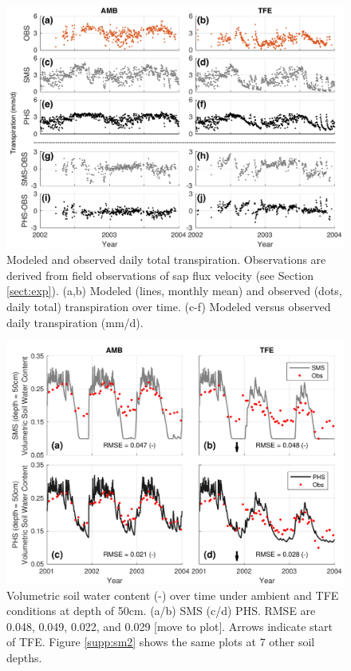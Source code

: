 \documentclass[draft,linenumbers]{agujournal}
\begin{document}
    \clearpage   
      \begin{figure}[h]
     \centering
     \includegraphics[width=30pc]{../figs3/fctr_ts.pdf}
     \caption{Modeled and observed daily total transpiration. Observations are derived from field observations of sap flux velocity (see Section \ref{sect:exp}).
     (a,b) Modeled (lines, monthly mean) and observed (dots, daily total) transpiration over time.
     (c-f) Modeled versus observed daily transpiration (mm/d).
     }
     \label{fig:t2}
  \end{figure}
    


        \clearpage
    \begin{figure}[h]
     \centering
     \includegraphics[width=30pc]{../figs3/sm2.pdf}
     \caption{Volumetric soil water content (-) over time under ambient and TFE conditions at depth of 50cm.
     (a/b) SMS
     (c/d) PHS.
     RMSE are 0.048, 0.049, 0.022, and 0.029 [move to plot].
     Arrows indicate start of TFE. Figure \ref{supp:sm2} shows the same plots at 7 other soil depths. }
     \label{fig:sm2}
  \end{figure}
\end{document}
